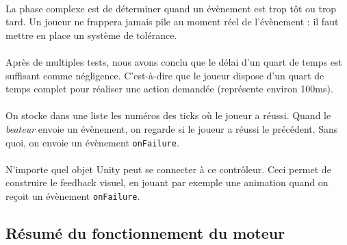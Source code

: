 \paragraph{}

La phase complexe est de déterminer quand un évènement est trop tôt ou trop tard. Un joueur ne frappera jamais pile au moment réel de l'évènement : il faut mettre en place un système de tolérance.
\\\\
Après de multiples tests, nous avons conclu que le délai d'un quart de temps est suffisant comme négligence. C'est-à-dire que le joueur dispose d'un quart de temps complet pour réaliser une action demandée (représente environ 100ms).
\\\\
On stocke dans une liste les numéros des ticks où le joueur a réussi. Quand le \textit{beateur} envoie un évènement, on regarde si le joueur a réussi le précédent. Sans quoi, on envoie un évènement \texttt{onFailure}.
\\\\
N'importe quel objet Unity peut se connecter à ce contrôleur. Ceci permet de construire le feedback visuel, en jouant par exemple une animation quand on reçoit un évènement \texttt{onFailure}.

\subsection{Résumé du fonctionnement du moteur}
\label{engine_summary}
\noindent
{}
\paragraph{}

